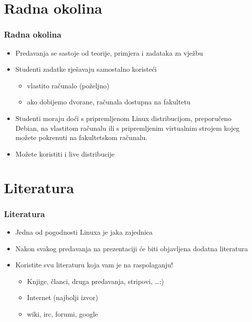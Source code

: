 \documentclass{beamer}
\begin{document}
\section{Radna okolina}
\begin{frame}[t]
\frametitle{Radna okolina}
\begin{itemize}
	\item Predavanja se sastoje od teorije, primjera i zadataka za vježbu
	\item Studenti zadatke rješavaju samostalno koristeći
	\begin{itemize}
		\item vlastito računalo (poželjno)
		\item ako dobijemo dvorane, računala dostupna na fakultetu
	\end{itemize}
	\item Studenti moraju doći s pripremljenom Linux distribucijom, preporučeno Debian, na vlastitom računalu ili s pripremljenim virtualnim strojem kojeg možete pokrenuti na fakultetskom računalu.
	\item Možete koristiti i live distribucije
\end{itemize}
\end{frame}

\section{Literatura}
\begin{frame}[t]
\frametitle{Literatura}
\begin{itemize}
	\item Jedna od pogodnosti Linuxa je jaka zajednica
	\item Nakon svakog predavanja na prezentaciji će biti objavljena dodatna literatura
	\item Koristite svu literaturu koja vam je na raspolaganju!
	\begin{itemize}
		\item Knjige, članci, druga predavanja, stripovi, \ldots :)
		\item Internet (najbolji izvor)
		\item wiki, irc, forumi, google 
	\end{itemize}
\end{itemize}
\end{frame}
\end{document}
